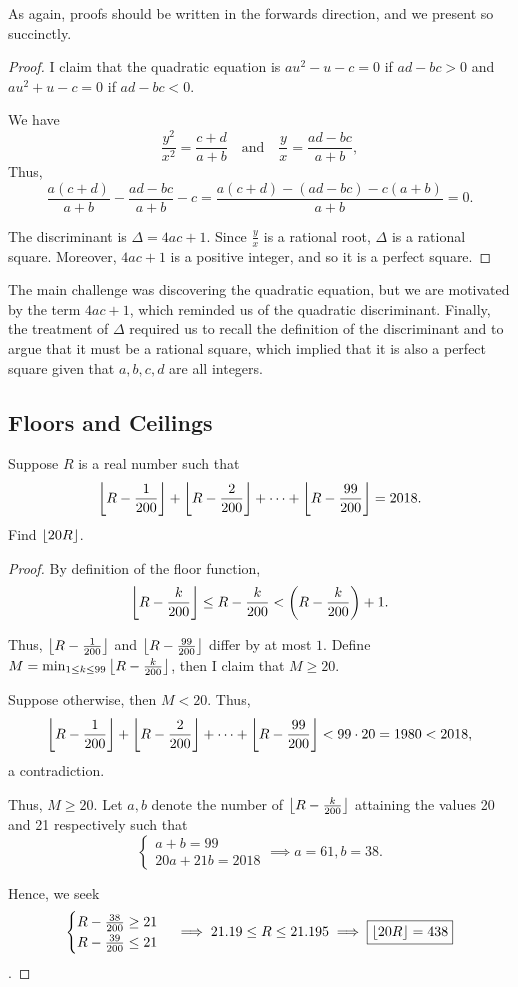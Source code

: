 \documentclass[../main.tex]{subfiles}
\begin{document}
As again, proofs should be written in the forwards direction, and we present so succinctly.
\begin{proof}
I claim that the quadratic equation is $au^2-u-c=0$ if $ad-bc > 0$ and $au^2+u-c=0$ if $ad-bc < 0$.

We have $$\frac{y^2}{x^2}=\frac{c+d}{a+b} \quad\text{and}\quad \frac{y}{x}=\frac{ad-bc}{a+b},$$
Thus, $$\frac{a(c+d)}{a+b}-\frac{ad-bc}{a+b}-c=\frac{a(c+d)-(ad-bc)-c(a+b)}{a+b}=0.$$

The discriminant is $\Delta=4ac+1$. Since $\frac{y}{x}$ is a rational root, $\Delta$ is a rational square. Moreover, $4ac+1$ is a positive integer, and so it is a perfect square.
\end{proof}
\begin{moral}
The main challenge was discovering the quadratic equation, but we are motivated by the term $4ac+1$, which reminded us of the quadratic discriminant. Finally, the treatment of $\Delta$ required us to recall the definition of the discriminant and to argue that it must be a rational square, which implied that it is also a perfect square given that $a,b,c,d$ are all integers.
\end{moral}

\subsection{Floors and Ceilings}
\begin{example}[2018 SMO(S) P25]
    Suppose $R$ is a real number such that
    $$\left\lfloor R-\frac{1}{200} \right\rfloor+\left\lfloor R-\frac{2}{200} \right\rfloor+\cdots+\left\lfloor R-\frac{99}{200} \right\rfloor=2018.$$
    Find $\left\lfloor 20R \right\rfloor$.
\end{example}
\begin{proof}
    By definition of the floor function,
    $$\left\lfloor R-\frac{k}{200} \right\rfloor\leq R-\frac{k}{200} < \left(R-\frac{k}{200}\right)+1.$$
    
    Thus, $\left\lfloor R-\frac{1}{200} \right\rfloor$ and $\left\lfloor R-\frac{99}{200} \right\rfloor$ differ by at most $1$. Define $M=\min_{1\leq k\leq 99}\left\lfloor R-\frac{k}{200} \right\rfloor$, then I claim that $M\geq 20$.

    Suppose otherwise, then $M < 20$. Thus, 
    $$\left\lfloor R-\frac{1}{200} \right\rfloor+\left\lfloor R-\frac{2}{200} \right\rfloor+\cdots+\left\lfloor R-\frac{99}{200} \right\rfloor < 99\cdot 20 = 1980 < 2018,$$
    a contradiction.

    Thus, $M \geq 20$. Let $a, b$ denote the number of $\left\lfloor R-\frac{k}{200} \right\rfloor$ attaining the values 20 and 21 respectively such that
    $$\begin{cases}
        a+b=99 \\
        20a+21b=2018
    \end{cases}
    \implies a=61, b=38.$$

    Hence, we seek 
    $$\begin{cases}
        R-\frac{38}{200} \geq 21 \\
        R-\frac{39}{200}\leq 21
    \end{cases}
    \implies 21.19 \leq R \leq 21.195 \implies \boxed{\left\lfloor 20R \right\rfloor=438}$$.
\end{proof}
\end{document}
